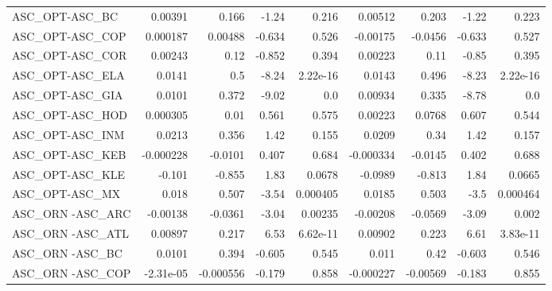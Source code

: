 \begin{tabular}{lrrrrrrrr}
ASC\_OPT-ASC\_BC                         &     0.00391 &        0.166 &   -1.24 &    0.216 &    0.00512 &       0.203 &        -1.22 &         0.223 \\
ASC\_OPT-ASC\_COP                        &    0.000187 &      0.00488 &  -0.634 &    0.526 &   -0.00175 &     -0.0456 &       -0.633 &         0.527 \\
ASC\_OPT-ASC\_COR                        &     0.00243 &         0.12 &  -0.852 &    0.394 &    0.00223 &        0.11 &        -0.85 &         0.395 \\
ASC\_OPT-ASC\_ELA                        &      0.0141 &          0.5 &   -8.24 & 2.22e-16 &     0.0143 &       0.496 &        -8.23 &      2.22e-16 \\
ASC\_OPT-ASC\_GIA                        &      0.0101 &        0.372 &   -9.02 &      0.0 &    0.00934 &       0.335 &        -8.78 &           0.0 \\
ASC\_OPT-ASC\_HOD                        &    0.000305 &         0.01 &   0.561 &    0.575 &    0.00223 &      0.0768 &        0.607 &         0.544 \\
ASC\_OPT-ASC\_INM                        &      0.0213 &        0.356 &    1.42 &    0.155 &     0.0209 &        0.34 &         1.42 &         0.157 \\
ASC\_OPT-ASC\_KEB                        &   -0.000228 &      -0.0101 &   0.407 &    0.684 &  -0.000334 &     -0.0145 &        0.402 &         0.688 \\
ASC\_OPT-ASC\_KLE                        &      -0.101 &       -0.855 &    1.83 &   0.0678 &    -0.0989 &      -0.813 &         1.84 &        0.0665 \\
ASC\_OPT-ASC\_MX                         &       0.018 &        0.507 &   -3.54 & 0.000405 &     0.0185 &       0.503 &         -3.5 &      0.000464 \\
ASC\_ORN -ASC\_ARC                       &    -0.00138 &      -0.0361 &   -3.04 &  0.00235 &   -0.00208 &     -0.0569 &        -3.09 &         0.002 \\
ASC\_ORN -ASC\_ATL                       &     0.00897 &        0.217 &    6.53 & 6.62e-11 &    0.00902 &       0.223 &         6.61 &      3.83e-11 \\
ASC\_ORN -ASC\_BC                        &      0.0101 &        0.394 &  -0.605 &    0.545 &      0.011 &        0.42 &       -0.603 &         0.546 \\
ASC\_ORN -ASC\_COP                       &   -2.31e-05 &    -0.000556 &  -0.179 &    0.858 &  -0.000227 &    -0.00569 &       -0.183 &         0.855 \\

\end{tabular}
